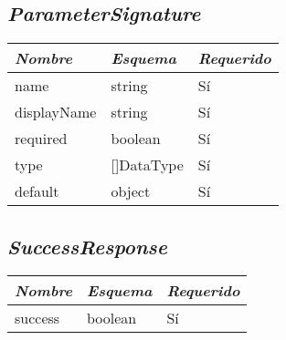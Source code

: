 \subsection{\textit{ParameterSignature}}
\begin{table}[H]
    \centering
    \def\arraystretch{1.25}
    \begin{adjustbox}{max width=\textwidth}
    \begin{tabularx}{\textwidth}{|L|l|l|}
    \hline
        \textbf{\textit{Nombre}} & \textbf{\textit{Esquema}} & \textbf{\textit{Requerido}} \\ \hline
    \hline
        name & string & Sí \\ \hline
        displayName & string & Sí \\ \hline
        required & boolean & Sí \\ \hline
        type & []DataType & Sí \\ \hline
        default & object & Sí \\ \hline
    \end{tabularx}
    \end{adjustbox}
\end{table}

\subsection{\textit{SuccessResponse}}
\begin{table}[H]
    \centering
    \def\arraystretch{1.25}
    \begin{adjustbox}{max width=\textwidth}
    \begin{tabularx}{\textwidth}{|L|l|l|}
    \hline
        \textbf{\textit{Nombre}} & \textbf{\textit{Esquema}} & \textbf{\textit{Requerido}} \\ \hline
    \hline
    	success & boolean & Sí \\ \hline
    \end{tabularx}
    \end{adjustbox}
\end{table}

